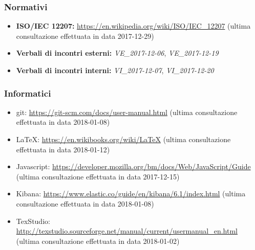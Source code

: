 	\subsubsection{Normativi}
		\begin{itemize}
			\item \textbf{ISO/IEC 12207:} \href{https://en.wikipedia.org/wiki/ISO/IEC\_12207}{https://en.wikipedia.org/wiki/ISO/IEC\_12207} (ultima consultazione effettuata in data 2017-12-29)
			\item \textbf{Verbali di incontri esterni:} \emph{VE\_2017-12-06}, \emph{VE\_2017-12-19}
			\item \textbf{Verbali di incontri interni:}	\emph{VI\_2017-12-07}, \emph{VI\_2017-12-20}	
		\end{itemize}
	\subsubsection{Informatici}
	\begin{itemize}
		\item git:
		\href{https://git-scm.com/docs/user-manual.html}{https://git-scm.com/docs/user-manual.html} (ultima consultazione effettuata in data 2018-01-08)
		
		\item \LaTeX:  \href{https://en.wikibooks.org/wiki/LaTeX}{https://en.wikibooks.org/wiki/LaTeX} (ultima consultazione effettuata in data 2018-01-12)
		
		\item Javascript:
		\href{https://developer.mozilla.org/bm/docs/Web/JavaScript/Guide}{https://developer.mozilla.org/bm/docs/Web/JavaScript/Guide} (ultima consultazione effettuata in data 2017-12-15)
		
		\item Kibana: \href{https://www.elastic.co/guide/en/kibana/6.1/index.html}{https://www.elastic.co/guide/en/kibana/6.1/index.html} (ultima consultazione effettuata in data 2018-01-08)
		
		\item TexStudio: 
		\href{http://texstudio.sourceforge.net/manual/current/usermanual\_en.html}{http://texstudio.sourceforge.net/manual/current/usermanual\_en.html} (ultima consultazione effettuata in data 2018-01-02)
	\end{itemize}
	